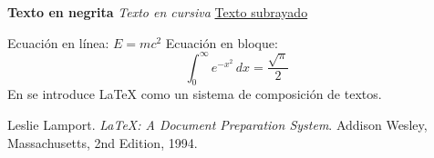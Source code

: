 \documentclass{article}
\begin{document}
	\textbf{Texto en negrita}
	\textit{Texto en cursiva}
	\underline{Texto subrayado}
	
	Ecuación en línea: $E=mc^2$
	Ecuación en bloque:
	\[ \int_{0}^{\infty} e^{-x^2} \, dx = \frac{\sqrt{\pi}}{2} \]
	En \cite{lamport94} se introduce LaTeX como un sistema de composición de textos.
	
	\begin{thebibliography}{9}
		Leslie Lamport.
		\textit{LaTeX: A Document Preparation System}.
		Addison Wesley, Massachusetts, 2nd Edition, 1994.
	\end{thebibliography}
\end{document}

